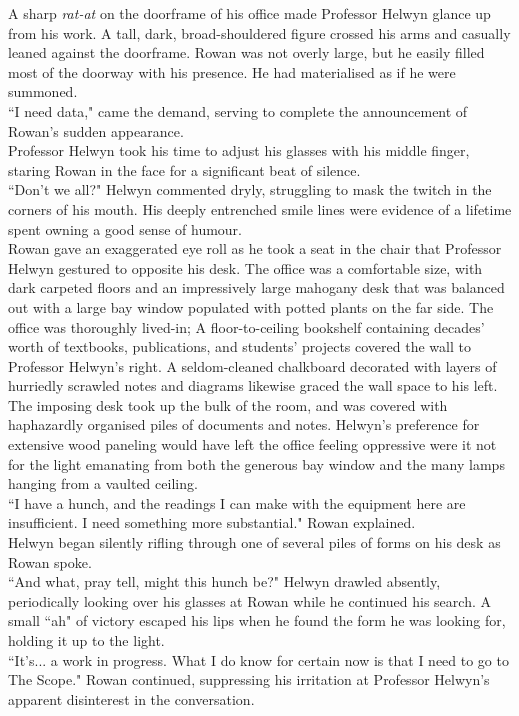 A sharp \textit{rat-at} on the doorframe of his office made Professor Helwyn glance up from his work.
A tall, dark, broad-shouldered figure crossed his arms and casually leaned against the doorframe.
Rowan was not overly large, but he easily filled most of the doorway with his presence.
He had materialised as if he were summoned.\\
``I need data," came the demand, serving to complete the announcement of Rowan's sudden appearance.\\ 
Professor Helwyn took his time to adjust his glasses with his middle finger, staring Rowan in the face for a significant beat of silence.\\
``Don't we all?" Helwyn commented dryly, struggling to mask the twitch in the corners of his mouth.
His deeply entrenched smile lines were evidence of a lifetime spent owning a good sense of humour.\\

Rowan gave an exaggerated eye roll as he took a seat in the chair that Professor Helwyn gestured to opposite his desk.
The office was a comfortable size, with dark carpeted floors and an impressively large mahogany desk that was balanced out with a large bay window populated with potted plants on the far side. 
The office was thoroughly lived-in; 
A floor-to-ceiling bookshelf containing decades' worth of textbooks, publications, and students' projects covered the wall to Professor Helwyn's right.
A seldom-cleaned chalkboard decorated with layers of hurriedly scrawled notes and diagrams likewise graced the wall space to his left. 
The imposing desk took up the bulk of the room, and was covered with haphazardly organised piles of documents and notes.
Helwyn's preference for extensive wood paneling would have left the office feeling oppressive were it not for the light emanating from both the generous bay window and the many lamps hanging from a vaulted ceiling.\\

``I have a hunch, and the readings I can make with the equipment here are insufficient. I need something more substantial." Rowan explained.\\
Helwyn began silently rifling through one of several piles of forms on his desk as Rowan spoke.\\
``And what, pray tell, might this hunch be?" Helwyn drawled absently, periodically looking over his glasses at Rowan while he continued his search.
A small ``ah" of victory escaped his lips when he found the form he was looking for, holding it up to the light.\\
``It's... a work in progress. What I do know for certain now is that I need to go to The Scope." Rowan continued, suppressing his irritation at Professor Helwyn's apparent disinterest in the conversation.\\


